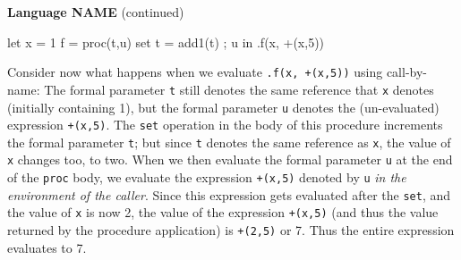 \begin{minipage}[t]{\sw}
\slidenumber
\LARGE
{\bf Language {\color{red} NAME}} (continued)
\Large
\begin{qv}
let
  x = 1
  f = proc(t,u)
        {
          set t = add1(t) ;
          u
        }
in
  .f(x, +(x,5))
\end{qv}
\LARGE
Consider now what happens when we evaluate \verb'.f(x, +(x,5))'
using call-by-name:
The formal parameter \verb't' still denotes 
the same reference that \verb'x' denotes (initially containing 1),
but the formal parameter \verb'u' denotes
the (un-evaluated) expression \verb'+(x,5)'.\exx
The \verb'set' operation in the body of this procedure
increments the formal parameter \verb't';
but since \verb't' denotes the same reference as \verb'x',
the value of \verb'x' changes too, to two.
When we then evaluate the formal parameter \verb'u'
at the end of the \verb'proc' body,
we evaluate the expression \verb'+(x,5)' denoted by \verb'u'
{\em in the environment of the caller}.
Since this expression gets evaluated after the \verb'set',
and the value of \verb'x' is now 2,
the value of the expression \verb'+(x,5)'
(and thus the value returned by the procedure application)
is \verb'+(2,5)' or 7.
Thus the entire expression evaluates to 7.
\end{minipage}
\clearpage
